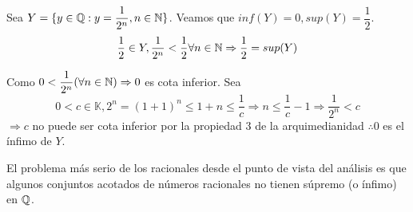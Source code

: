 \clearpage

\begin{eg}
    Sea $Y = \{ y \in \mathbb{Q} : y=\dfrac{1}{2^n}, n\in \mathbb{N} \}$. Veamos que $inf(Y) =0, sup(Y) = \dfrac{1}{2}$.
    \begin{equation}
        \dfrac{1}{2} \in Y, \dfrac{1}{2^n}<\dfrac{1}{2} \forall n \in \mathbb{N} \Rightarrow \dfrac{1}{2} = sup(Y)
    \end{equation}

    Como $0 < \dfrac{1}{2^n} (\forall n \in \mathbb{N}) \Rightarrow 0$ es cota inferior.
    Sea
    \begin{equation}
        0 < c \in \mathbb{K}, 2^n = (1+1)^n \leq 1+n \leq \dfrac{1}{c} \Rightarrow n \leq \dfrac{1}{c} -1 \Rightarrow \dfrac{1}{2^n} < c
    \end{equation}
    $\Rightarrow c$ no puede ser cota inferior por la propiedad 3 de la arquimedianidad $\therefore 0$ es el ínfimo de $Y$.
\end{eg}

El problema más serio de los racionales desde el punto de vista del análisis es que algunos conjuntos acotados de números racionales no tienen súpremo (o ínfimo) en $\mathbb{Q}$.

